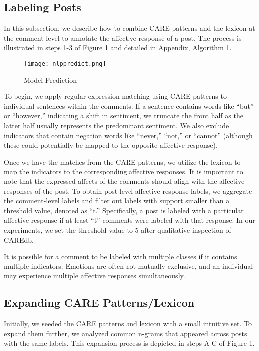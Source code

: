 \documentclass[conference]{IEEEtran}
\begin{document}
\subsection{Labeling Posts}

In this subsection, we describe how to combine CARE patterns and the lexicon at the comment level to annotate the affective response of a post. The process is illustrated in steps 1-3 of Figure 1 and detailed in Appendix, Algorithm 1.
\begin{figure}
    \centering
    \texttt{[image: nlppredict.png]}
    \caption{Model Prediction}
    \label{fig:picture}
\end{figure}
To begin, we apply regular expression matching using CARE patterns to individual sentences within the comments. If a sentence contains words like ``but'' or ``however,'' indicating a shift in sentiment, we truncate the front half as the latter half usually represents the predominant sentiment. We also exclude indicators that contain negation words like ``never,'' ``not,'' or ``cannot'' (although these could potentially be mapped to the opposite affective response).

Once we have the matches from the CARE patterns, we utilize the lexicon to map the indicators to the corresponding affective responses. It is important to note that the expressed affects of the comments should align with the affective responses of the post. To obtain post-level affective response labels, we aggregate the comment-level labels and filter out labels with support smaller than a threshold value, denoted as ``t.'' Specifically, a post is labeled with a particular affective response if at least ``t'' comments were labeled with that response. In our experiments, we set the threshold value to 5 after qualitative inspection of CAREdb.

It is possible for a comment to be labeled with multiple classes if it contains multiple indicators. Emotions are often not mutually exclusive, and an individual may experience multiple affective responses simultaneously.

\subsection{Expanding CARE Patterns/Lexicon}

Initially, we seeded the CARE patterns and lexicon with a small intuitive set. To expand them further, we analyzed common n-grams that appeared across posts with the same labels. This expansion process is depicted in steps A-C of Figure 1.
\end{document}

